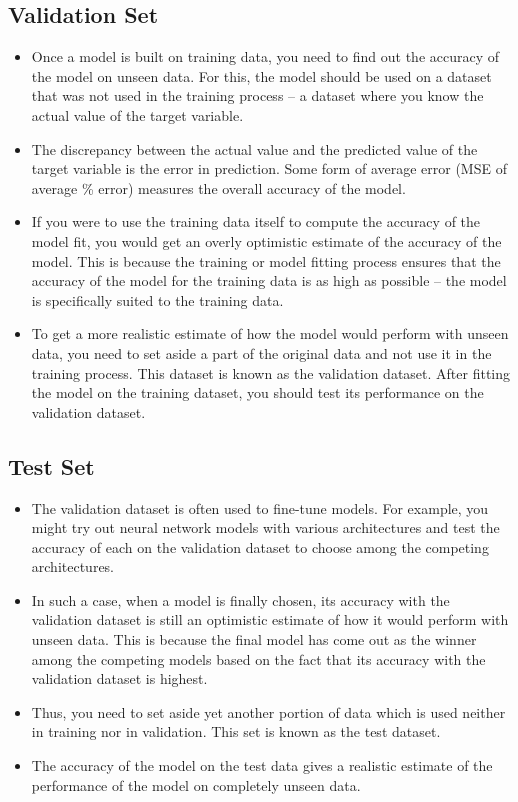 \documentclass[a4paper,12pt]{article}
\begin{document}
\subsection*{Validation Set}
\begin{itemize}
	\item Once a model is built on training data, you need to find out the accuracy of the model on unseen data. For this, the model should be used on a dataset that was not used in the training process -- a dataset where you know the actual value of the target variable. 
	\item The discrepancy between the actual value and the predicted value of the target variable is the error in prediction. Some form of average error (MSE of average \% error) measures the overall accuracy of the model.
	\item If you were to use the training data itself to compute the accuracy of the model fit, you would get an overly optimistic estimate of the accuracy of the model. This is because the training or model fitting process ensures that the accuracy of the model for the training data is as high as possible -- the model is specifically suited to the training data. 
	\item To get a more realistic estimate of how the model would perform with unseen data, you need to set aside a part of the original data and not use it in the training process. This dataset is known as the validation dataset. After fitting the model on the training dataset, you should test its performance on the validation dataset.
\end{itemize}

\subsection*{Test Set}
\begin{itemize}
	\item The validation dataset is often used to fine-tune models. For example, you might try out neural network models with various architectures and test the accuracy of each on the validation dataset to choose among the competing architectures. 
	\item In such a case, when a model is finally chosen, its accuracy with the validation dataset is still an optimistic estimate of how it would perform with unseen data. This is because the final model has come out as the winner among the competing models based on the fact that its accuracy with the validation dataset is highest. 
	\item Thus, you need to set aside yet another portion of data which is used neither in training nor in validation. This set is known as the test dataset. \item The accuracy of the model on the test data gives a realistic estimate of the performance of the model on completely unseen data.
\end{itemize}
\end{document}
